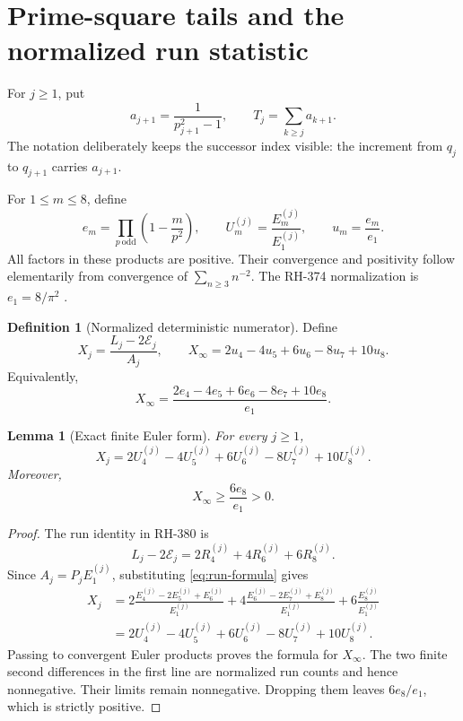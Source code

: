 \documentclass[11pt]{article}
\newtheorem{lemma}[theorem]{Lemma}
\theoremstyle{definition}
\newtheorem{definition}[theorem]{Definition}
\theoremstyle{remark}
\newcommand{\Ecal}{\mathcal E}
\begin{document}
\section{Prime-square tails and the normalized run statistic}

For $j\ge1$, put
\begin{equation}
 a_{j+1}=\frac1{p_{j+1}^2-1},\qquad
 T_j=\sum_{k\ge j}a_{k+1}.
 \label{eq:T}
\end{equation}
The notation deliberately keeps the successor index visible: the increment
from $q_j$ to $q_{j+1}$ carries $a_{j+1}$.

For $1\le m\le8$, define
\begin{equation}
 e_m=\prod_{p\ \mathrm{odd}}\left(1-\frac m{p^2}\right),\qquad
 U_m^{(j)}=\frac{E_m^{(j)}}{E_1^{(j)}},\qquad
 u_m=\frac{e_m}{e_1}.
 \label{eq:ratios}
\end{equation}
All factors in these products are positive.  Their convergence and
positivity follow elementarily from convergence of $\sum_{n\ge3}n^{-2}$.
The RH-374 normalization is $e_1=8/\pi^2$ \cite{RH374}.

\begin{definition}[Normalized deterministic numerator]
Define
\begin{equation}
 X_j=\frac{L_j-2\Ecal_j}{A_j},
 \qquad
 X_\infty=2u_4-4u_5+6u_6-8u_7+10u_8.
 \label{eq:X-def}
\end{equation}
Equivalently,
\[
 X_\infty=
 \frac{2e_4-4e_5+6e_6-8e_7+10e_8}{e_1}.
\]
\end{definition}

\begin{lemma}[Exact finite Euler form]
\label{lem:X-euler}
For every $j\ge1$,
\begin{equation}
 X_j=2U_4^{(j)}-4U_5^{(j)}+6U_6^{(j)}
      -8U_7^{(j)}+10U_8^{(j)}.
 \label{eq:X-euler}
\end{equation}
Moreover,
\begin{equation}
 X_\infty\ge\frac{6e_8}{e_1}>0.
 \label{eq:X-positive}
\end{equation}
\end{lemma}

\begin{proof}
The run identity in RH-380 is
\[
 L_j-2\Ecal_j=2R_4^{(j)}+4R_6^{(j)}+6R_8^{(j)}.
\]
Since $A_j=P_jE_1^{(j)}$, substituting \eqref{eq:run-formula} gives
\begin{align*}
X_j
&=2\frac{E_4^{(j)}-2E_5^{(j)}+E_6^{(j)}}{E_1^{(j)}}
 +4\frac{E_6^{(j)}-2E_7^{(j)}+E_8^{(j)}}{E_1^{(j)}}
 +6\frac{E_8^{(j)}}{E_1^{(j)}}\\
&=2U_4^{(j)}-4U_5^{(j)}+6U_6^{(j)}
 -8U_7^{(j)}+10U_8^{(j)}.
\end{align*}
Passing to convergent Euler products proves the formula for $X_\infty$.
The two finite second differences in the first line are normalized run
counts and hence nonnegative.  Their limits remain nonnegative.  Dropping
them leaves $6e_8/e_1$, which is strictly positive.
\end{proof}
\end{document}

